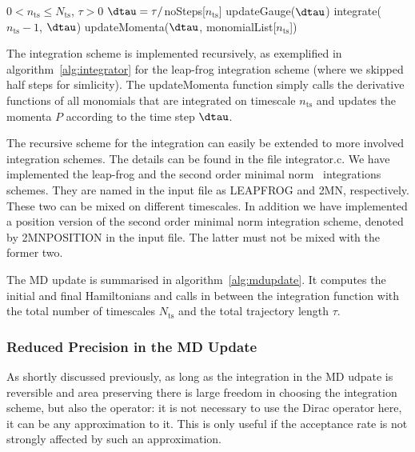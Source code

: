 \begin{algorithm}[t]
  \caption{integrate}
  \begin{algorithmic}[1]
    \REQUIRE $0 < n_\mathrm{ts}\leq N_\mathrm{ts}$, $\tau > 0$
    \STATE $\dtau = \tau/$noSteps[$n_\mathrm{ts}$]
    \STATE updateGauge($\dtau$)
    \ELSE
    \STATE integrate($n_\mathrm{ts}-1$, $\dtau$)
    \ENDIF
    \STATE updateMomenta($\dtau$, monomialList[$n_\mathrm{ts}$])
    \ENDFOR
  \end{algorithmic}
  \label{alg:integrator}
\end{algorithm}

The integration scheme is implemented recursively, as exemplified in
algorithm~\ref{alg:integrator} for the leap-frog integration scheme
(where we skipped half steps for simlicity). The updateMomenta
function simply calls the derivative functions of all monomials
that are integrated on timescale $n_\mathrm{ts}$ and updates the
momenta $P$ according to the time step $\dtau$.

The recursive scheme for the integration can easily be extended to
more involved integration schemes. The details can be found in the
file {\ttfamily integrator.c}. We have implemented the leap-frog and
the second order minimal norm~\cite{Takaishi:2005tz} integrations
schemes. They are named in the input file as {\ttfamily LEAPFROG} and
{\ttfamily 2MN}, respectively. These two can be mixed on
different timescales. In addition we have implemented a position
version of the second order minimal norm integration scheme, denoted by
{\ttfamily 2MNPOSITION} in the input file. The latter must not be mixed with
the former two.

The MD update is summarised in
algorithm~\ref{alg:mdupdate}. It computes the initial and final
Hamiltonians and calls in between the integration function with the
total number of timescales $N_\mathrm{ts}$ and the total trajectory
length $\tau$.

\subsubsection{Reduced Precision in the MD Update}

As shortly discussed previously, as long as the integration in the MD
udpate is reversible and area preserving there is large freedom in
choosing the integration scheme, but also the operator: it is not
necessary to use the Dirac operator here, it can be any approximation
to it. This is only useful if the acceptance rate is not strongly
affected by such an approximation.


